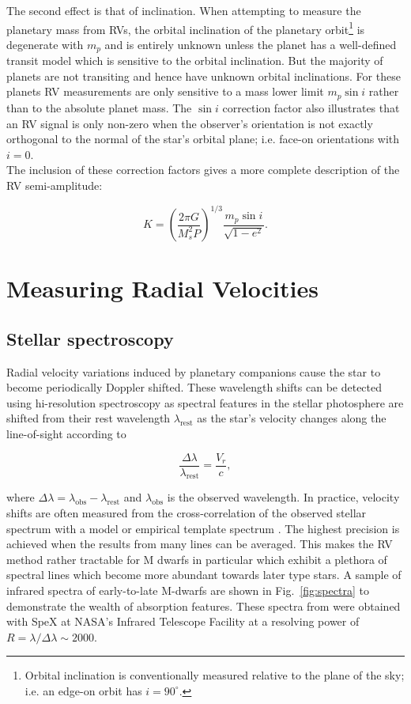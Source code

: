 The second effect is that of inclination. When attempting to measure the planetary 
mass from RVs, the orbital inclination of the planetary orbit\footnote{Orbital 
inclination is conventionally measured  relative 
to the plane of the sky; i.e. an edge-on orbit has $i=90^{\circ}$.} is degenerate with
$m_p$ and is entirely unknown unless the planet has a well-defined transit model which is sensitive
to the orbital inclination. But the majority of planets are not transiting and hence have unknown
orbital inclinations. For these planets RV measurements 
are only sensitive to a mass lower limit $m_p\sin{i}$ rather than to the absolute planet mass.
The $\sin{i}$ correction factor also illustrates that an RV signal is only non-zero when
the observer's orientation is not exactly orthogonal to the normal of the star's orbital plane;
i.e. face-on orientations with $i=0$. \\

The inclusion of these correction factors gives a more complete description of the RV semi-amplitude: 

\begin{equation}
K = \left( \frac{2\pi G}{M_s^2 P} \right)^{1/3} \frac{m_p \sin{i}}{\sqrt{1-e^2}}. 
\label{eq:K2}
\end{equation}

\section{Measuring Radial Velocities} \label{sect:spectrograph}
\subsection{Stellar spectroscopy}
Radial velocity variations induced by planetary companions cause the star to become 
periodically Doppler shifted. These wavelength shifts can be detected using hi-resolution 
spectroscopy as spectral features in the stellar photosphere are shifted from their 
rest wavelength $\lambda_{\text{rest}}$ as the star's velocity changes along the line-of-sight 
according to 

\begin{equation}
\frac{\Delta \lambda}{\lambda_{\text{rest}}} = \frac{V_r}{c},
\end{equation}

\noindent where $\Delta \lambda = \lambda_{\text{obs}}-\lambda_{\text{rest}}$ and
$\lambda_{\text{obs}}$ is the observed wavelength. 
In practice, velocity shifts are often measured from the cross-correlation of 
the observed stellar spectrum with a model or empirical template spectrum \citep{astudillodefru15}.
The highest precision is achieved when the results from many lines can be averaged. This makes
the RV method rather tractable for M dwarfs in particular which exhibit a plethora of 
spectral lines which become more abundant towards later type stars.
A sample of infrared spectra of early-to-late M-dwarfs 
are shown in Fig.~\ref{fig:spectra} to demonstrate the wealth of absorption features. 
These spectra from \cite{rayner09} were obtained 
with SpeX at NASA's Infrared Telescope Facility at a resolving power of 
$R=\lambda / \Delta \lambda \sim 2000$. \\ 

